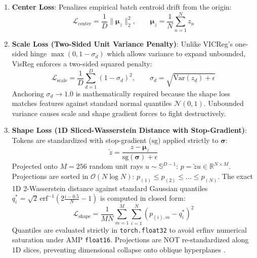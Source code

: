 \documentclass{article}
\begin{document}
\begin{enumerate}
    \item \textbf{Center Loss}: Penalizes empirical batch centroid drift from the origin:
    \begin{equation}
        \mathcal{L}_{\text{center}} = \frac{1}{D} \|\boldsymbol{\mu}_z\|_2^2, \qquad \boldsymbol{\mu}_z = \frac{1}{N} \sum_{n=1}^N z_n
    \end{equation}
    \item \textbf{Scale Loss (Two-Sided Unit Variance Penalty)}:
    Unlike VICReg's one-sided hinge $\max(0, 1 - \sigma_d)$ \citep{bardes2021vicreg} which allows variance to expand unbounded, VisReg enforces a two-sided squared penalty:
    \begin{equation}
        \mathcal{L}_{\text{scale}} = \frac{1}{D} \sum_{d=1}^D (1 - \sigma_d)^2, \qquad \sigma_d = \sqrt{\text{Var}(z_d) + \epsilon}
    \end{equation}
    Anchoring $\sigma_d \to 1.0$ is mathematically required because the shape loss matches features against standard normal quantiles $\mathcal{N}(0, 1)$. Unbounded variance causes scale and shape gradient forces to fight destructively.
    \item \textbf{Shape Loss (1D Sliced-Wasserstein Distance with Stop-Gradient)}:
    Tokens are standardized with stop-gradient ($\text{sg}$) applied strictly to $\boldsymbol{\sigma}$:
    \begin{equation}
        \tilde{z} = \frac{z - \boldsymbol{\mu}_z}{\text{sg}(\boldsymbol{\sigma}) + \epsilon}
    \end{equation}
    Projected onto $M = 256$ random unit rays $u \sim \mathbb{S}^{D-1}$: $p = \tilde{z} u \in \mathbb{R}^{N \times M}$. Projections are sorted in $\mathcal{O}(N \log N)$: $p_{(1)} \le p_{(2)} \le \dots \le p_{(N)}$.
    The exact 1D 2-Wasserstein distance against standard Gaussian quantiles $q_i^* = \sqrt{2}\,\text{erf}^{-1}\left(2\frac{i - 0.5}{N} - 1\right)$ is computed in closed form:
    \begin{equation}
        \mathcal{L}_{\text{shape}} = \frac{1}{M N} \sum_{m=1}^M \sum_{i=1}^N \left(p_{(i), m} - q_i^*\right)^2
    \end{equation}
    Quantiles are evaluated strictly in \texttt{torch.float32} to avoid $\text{erfinv}$ numerical saturation under AMP \texttt{float16}. Projections are NOT re-standardized along 1D slices, preventing dimensional collapse onto oblique hyperplanes \citep{wu2026visreg,villani2009optimal}.
\end{enumerate}
\end{document}
